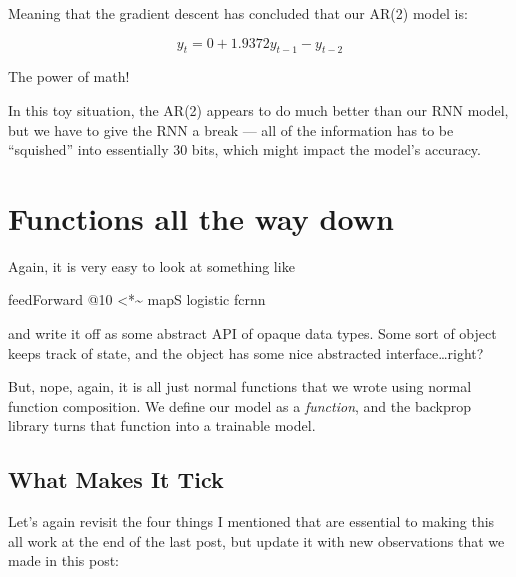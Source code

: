 \documentclass[]{article}
\newenvironment{Shaded}{}{}
\newcommand{\DecValTok}[1]{\textcolor[rgb]{0.25,0.63,0.44}{#1}}
\newcommand{\NormalTok}[1]{#1}
\newcommand{\OperatorTok}[1]{\textcolor[rgb]{0.40,0.40,0.40}{#1}}
\begin{document}
Meaning that the gradient descent has concluded that our AR(2) model is:

\[
y_t = 0 + 1.9372 y_{t - 1} - y_{t - 2}
\]

The power of math!

In this toy situation, the AR(2) appears to do much better than our RNN model,
but we have to give the RNN a break --- all of the information has to be
``squished'' into essentially 30 bits, which might impact the model's accuracy.

\section{Functions all the way down}\label{functions-all-the-way-down}

Again, it is very easy to look at something like

\begin{Shaded}
\begin{Highlighting}[]
\NormalTok{feedForward }\OperatorTok{@}\DecValTok{10} \OperatorTok{\textless{}*\textasciitilde{}}\NormalTok{ mapS logistic fcrnn}
\end{Highlighting}
\end{Shaded}

and write it off as some abstract API of opaque data types. Some sort of object
keeps track of state, and the object has some nice abstracted
interface\ldots right?

But, nope, again, it is all just normal functions that we wrote using normal
function composition. We define our model as a \emph{function}, and the backprop
library turns that function into a trainable model.

\subsection{What Makes It Tick}\label{what-makes-it-tick}

Let's again revisit the four things I mentioned that are essential to making
this all work at the end of the last post, but update it with new observations
that we made in this post:
\end{document}
